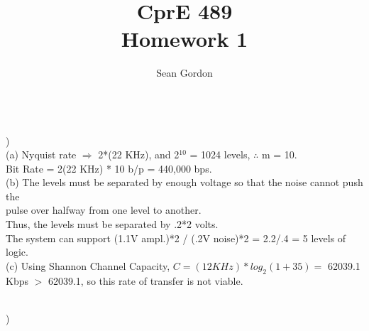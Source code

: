 \documentclass[12pt]{article}
\title{CprE 489\\Homework 1}
\author{Sean Gordon}
\begin{document}
\maketitle


\hrulefill \\


)\\
\indent (a) Nyquist rate $\Rightarrow$ 2*(22 KHz), and 2$^{10}$ = 1024 levels, $\therefore$ m = 10. \\
\indent \indent Bit Rate = 2(22 KHz) * 10 b/p = 440,000 bps.\\

(b) The levels must be separated by enough voltage so that the noise cannot push the \\
\indent \indent pulse over halfway from one level to another.\\
\indent \indent Thus, the levels must be separated by .2*2 volts.\\

\indent \indent The system can support (1.1V ampl.)*2 / (.2V noise)*2 = 2.2/.4 = 5 levels of logic.\\

\indent (c) Using Shannon Channel Capacity, $C = (12 KHz)*log_2(1+35) = $ 62039.1\\
\indent {} Kbps $>$ 62039.1, so this rate of transfer is not viable.

\hrulefill \\


)\\
\end{document}
